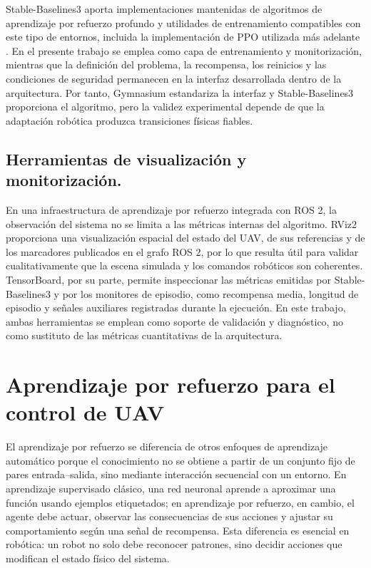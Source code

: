 Stable-Baselines3 aporta implementaciones mantenidas de algoritmos de aprendizaje
por refuerzo profundo y utilidades de entrenamiento compatibles con este tipo de
entornos, incluida la implementación de PPO utilizada más adelante
\cite{stablebaselines3_ppo}. En el presente trabajo se emplea como capa de
entrenamiento y monitorización, mientras que la definición del problema, la
recompensa, los reinicios y las condiciones de seguridad permanecen en la interfaz
desarrollada dentro de la arquitectura. Por tanto, Gymnasium estandariza la interfaz y Stable-Baselines3
proporciona el algoritmo, pero la validez experimental depende de que la
adaptación robótica produzca transiciones físicas fiables.

\subsection{Herramientas de visualización y monitorización.}
En una infraestructura de aprendizaje por refuerzo integrada con ROS 2, la
observación del sistema no se limita a las métricas internas del algoritmo. RViz2
proporciona una visualización espacial del estado del UAV, de sus referencias y
de los marcadores publicados en el grafo ROS 2, por lo que resulta útil para
validar cualitativamente que la escena simulada y los comandos robóticos son
coherentes. TensorBoard, por su parte, permite inspeccionar las métricas emitidas
por Stable-Baselines3 y por los monitores de episodio, como recompensa media,
longitud de episodio y señales auxiliares registradas durante la ejecución. En
este trabajo, ambas herramientas se emplean como soporte de validación y
diagnóstico, no como sustituto de las métricas cuantitativas de la arquitectura.


\section{Aprendizaje por refuerzo para el control de UAV}

El aprendizaje por refuerzo se diferencia de otros enfoques de aprendizaje
automático porque el conocimiento no se obtiene a partir de un conjunto fijo de
pares entrada--salida, sino mediante interacción secuencial con un entorno. En
aprendizaje supervisado clásico, una red neuronal aprende a aproximar una función
usando ejemplos etiquetados; en aprendizaje por refuerzo, en cambio, el agente
debe actuar, observar las consecuencias de sus acciones y ajustar su comportamiento
según una señal de recompensa. Esta diferencia es esencial en robótica: un robot no
solo debe reconocer patrones, sino decidir acciones que modifican el estado físico
del sistema.

